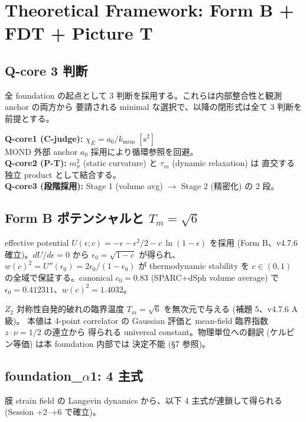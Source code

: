 \documentclass[11pt,a4paper]{ltjsarticle}
\newcommand{\epso}{\epsilon_0}
\newcommand{\kmem}{k_{\mathrm{mem}}}
\newcommand{\Tm}{T_{m}}
\newcommand{\taum}{\tau_{m}}
\newcommand{\msigma}{m_{\sigma}}
\begin{document}
\section{Theoretical Framework: Form B + FDT + Picture T}

\subsection{Q-core 3 判断}
全 foundation の起点として 3 判断を採用する。これらは内部整合性と観測 anchor の両方から
要請される minimal な選択で、以降の閉形式は全て 3 判断を前提とする。

\begin{keybox}
\textbf{Q-core1 (C-judge):} $\chi_E = a_0 / \kmem\;[\mathrm{s}^2]$\\
\quad MOND 外部 anchor $a_0$ 採用により循環参照を回避。\\[2pt]
\textbf{Q-core2 (P-T):} $\msigma^2$ (static curvature) と $\taum$ (dynamic relaxation) は
直交する独立 product として結合する。\\[2pt]
\textbf{Q-core3 (段階採用):} Stage 1 (volume avg) $\to$ Stage 2 (精密化) の 2 段。
\end{keybox}

\subsection{Form B ポテンシャルと $\Tm=\sqrt{6}$}
effective potential $U(\epsilon; c) = -\epsilon - \epsilon^2/2 - c\,\ln(1 - \epsilon)$ を採用
(Form B、v4.7.6 確立)。$dU/d\epsilon = 0$ から $\epso = \sqrt{1 - c}$ が得られ、
$w(c)^2 = U''(\epso) = 2\epso/(1 - \epso)$ が thermodynamic stability を
$c \in (0, 1)$ の全域で保証する。canonical $c_0 = 0.83$ (SPARC+dSph volume average) で
$\epso = 0.412311$、$w(c)^2 = 1.4032$。

$Z_2$ 対称性自発的破れの臨界温度 $\Tm = \sqrt{6}$ を無次元で与える (補題 5、v4.7.6 A 級)。
本値は 4-point correlator の Gaussian 評価と mean-field 臨界指数 $z \cdot \nu = 1/2$ の連立から
得られる universal constant。物理単位への翻訳 (ケルビン等価) は本 foundation 内部では
決定不能 (\S 7 参照)。

\subsection{foundation\_$\alpha$1: 4 主式}
膜 strain field の Langevin dynamics から、以下 4 主式が連鎖して得られる (Session +2--+6 で確立)。
\end{document}
